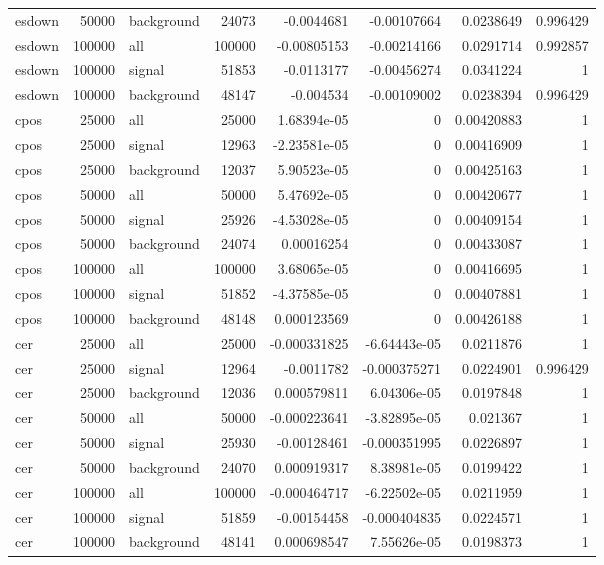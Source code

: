 \begin{table}[!ht]
\begin{tabular}{l r l r rrr r}
esdown & 50000 & background & 24073 & -0.0044681 & -0.00107664 & 0.0238649 & 0.996429 \\
esdown & 100000 & all & 100000 & -0.00805153 & -0.00214166 & 0.0291714 & 0.992857 \\
esdown & 100000 & signal & 51853 & -0.0113177 & -0.00456274 & 0.0341224 & 1 \\
esdown & 100000 & background & 48147 & -0.004534 & -0.00109002 & 0.0238394 & 0.996429 \\
cpos & 25000 & all & 25000 & 1.68394e-05 & 0 & 0.00420883 & 1 \\
cpos & 25000 & signal & 12963 & -2.23581e-05 & 0 & 0.00416909 & 1 \\
cpos & 25000 & background & 12037 & 5.90523e-05 & 0 & 0.00425163 & 1 \\
cpos & 50000 & all & 50000 & 5.47692e-05 & 0 & 0.00420677 & 1 \\
cpos & 50000 & signal & 25926 & -4.53028e-05 & 0 & 0.00409154 & 1 \\
cpos & 50000 & background & 24074 & 0.00016254 & 0 & 0.00433087 & 1 \\
cpos & 100000 & all & 100000 & 3.68065e-05 & 0 & 0.00416695 & 1 \\
cpos & 100000 & signal & 51852 & -4.37585e-05 & 0 & 0.00407881 & 1 \\
cpos & 100000 & background & 48148 & 0.000123569 & 0 & 0.00426188 & 1 \\
cer & 25000 & all & 25000 & -0.000331825 & -6.64443e-05 & 0.0211876 & 1 \\
cer & 25000 & signal & 12964 & -0.0011782 & -0.000375271 & 0.0224901 & 0.996429 \\
cer & 25000 & background & 12036 & 0.000579811 & 6.04306e-05 & 0.0197848 & 1 \\
cer & 50000 & all & 50000 & -0.000223641 & -3.82895e-05 & 0.021367 & 1 \\
cer & 50000 & signal & 25930 & -0.00128461 & -0.000351995 & 0.0226897 & 1 \\
cer & 50000 & background & 24070 & 0.000919317 & 8.38981e-05 & 0.0199422 & 1 \\
cer & 100000 & all & 100000 & -0.000464717 & -6.22502e-05 & 0.0211959 & 1 \\
cer & 100000 & signal & 51859 & -0.00154458 & -0.000404835 & 0.0224571 & 1 \\
cer & 100000 & background & 48141 & 0.000698547 & 7.55626e-05 & 0.0198373 & 1 \\
\bottomrule
\end{tabular}
\end{table}
